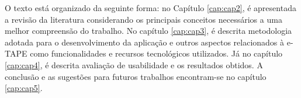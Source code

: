 \par
O texto está organizado da seguinte forma: no Capítulo \ref{cap:cap2}, é apresentada a revisão da literatura considerando os principais conceitos necessários a uma melhor 
compreensão do trabalho. No capítulo \ref{cap:cap3}, é descrita metodologia adotada para o desenvolvimento da aplicação e outros aspectos relacionados à e-TAPE como funcionalidades e recursos tecnológicos utilizados. Já no capítulo \ref{cap:cap4}, é descrita avaliação de usabilidade e os resultados obtidos. 
A conclusão e as sugestões para futuros trabalhos encontram-se no capítulo \ref{cap:cap5}.
